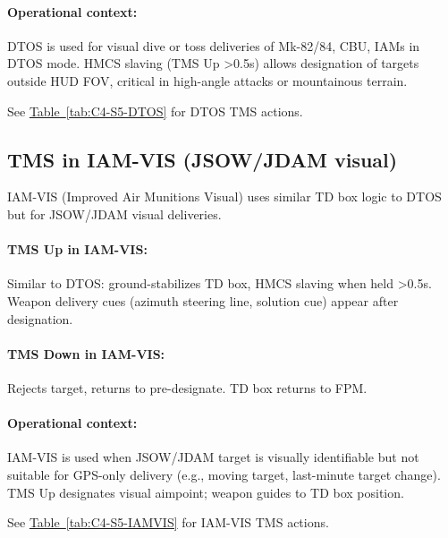 \documentclass[11pt, a4paper, twoside]{report}
\newcommand{\tabref}[1]{\hyperref[#1]{Table~\ref*{#1}}}
\begin{document}
\paragraph{Operational context:}
DTOS is used for visual dive or toss deliveries of Mk-82/84, CBU, IAMs in DTOS mode. HMCS slaving (TMS Up >0.5s) allows designation of targets outside HUD FOV, critical in high-angle attacks or mountainous terrain.

See \tabref{tab:C4-S5-DTOS} for DTOS TMS actions.

\subsection{TMS in IAM-VIS (JSOW/JDAM visual)}
\label{sec:C4-S5-S3}

IAM-VIS (Improved Air Munitions Visual) uses similar TD box logic to DTOS but for JSOW/JDAM visual deliveries.

\paragraph{TMS Up in IAM-VIS:}
Similar to DTOS: ground-stabilizes TD box, HMCS slaving when held >0.5s. Weapon delivery cues (azimuth steering line, solution cue) appear after designation.

\paragraph{TMS Down in IAM-VIS:}
Rejects target, returns to pre-designate. TD box returns to FPM.

\paragraph{Operational context:}
IAM-VIS is used when JSOW/JDAM target is visually identifiable but not suitable for GPS-only delivery (e.g., moving target, last-minute target change). TMS Up designates visual aimpoint; weapon guides to TD box position.

See \tabref{tab:C4-S5-IAMVIS} for IAM-VIS TMS actions.

\end{document}
